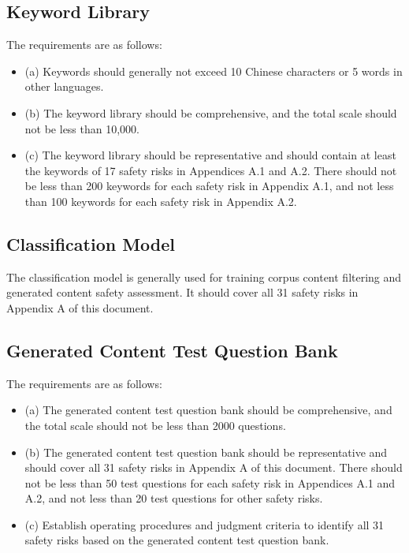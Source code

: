 \documentclass{article}
\begin{document}
\subsection{Keyword Library}
The requirements are as follows:
\begin{itemize}
    \item (a) Keywords should generally not exceed 10 Chinese characters or 5 words in other languages.
    \item (b) The keyword library should be comprehensive, and the total scale should not be less than 10,000.
    \item (c) The keyword library should be representative and should contain at least the keywords of 17 safety risks in Appendices A.1 and A.2. There should not be less than 200 keywords for each safety risk in Appendix A.1, and not less than 100 keywords for each safety risk in Appendix A.2.
\end{itemize}

\subsection{Classification Model}
The classification model is generally used for training corpus content filtering and generated content safety assessment. It should cover all 31 safety risks in Appendix A of this document.

\subsection{Generated Content Test Question Bank}
The requirements are as follows:
\begin{itemize}
    \item (a) The generated content test question bank should be comprehensive, and the total scale should not be less than 2000 questions.
    \item (b) The generated content test question bank should be representative and should cover all 31 safety risks in Appendix A of this document. There should not be less than 50 test questions for each safety risk in Appendices A.1 and A.2, and not less than 20 test questions for other safety risks.
    \item (c) Establish operating procedures and judgment criteria to identify all 31 safety risks based on the generated content test question bank.
\end{itemize}
\end{document}
